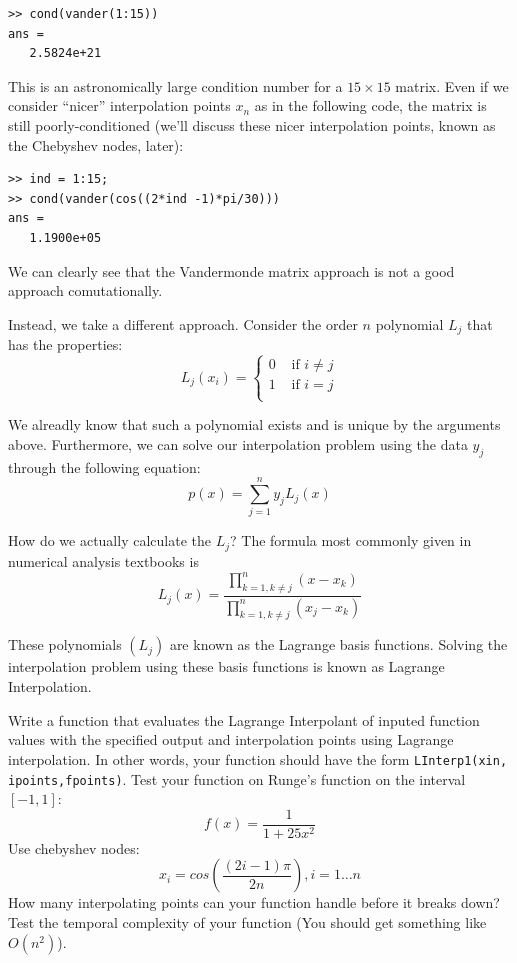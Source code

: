 \begin{verbatim}
>> cond(vander(1:15))
ans =
   2.5824e+21
\end{verbatim}

This is an astronomically large condition number for a $15 \times 15$ matrix. Even if we consider ``nicer'' interpolation points $x_n$ as in the following code, the matrix is still poorly-conditioned (we'll discuss these nicer interpolation points, known as the Chebyshev nodes, later):

\begin{verbatim}
>> ind = 1:15;
>> cond(vander(cos((2*ind -1)*pi/30)))
ans =
   1.1900e+05
\end{verbatim}

We can clearly see that the Vandermonde matrix approach is not a good approach comutationally.

Instead, we take a different approach. Consider the order $n$ polynomial $L_j$ that has the properties:
\[
L_j(x_i) = \begin{cases} 0 &\mbox{ if } i \neq j\\ 1 &\mbox{ if } i =j \\ \end{cases}
\]

We alreadly know that such a polynomial exists and is unique by the arguments above. Furthermore, we can solve our interpolation problem using the data $y_j$ through the following equation:
\[
p(x) = \sum_{j=1}^n y_j L_j(x)
\]

How do we actually calculate the $L_j$? The formula most commonly given in numerical analysis textbooks is
\[
L_j(x) = \frac{\displaystyle\prod_{k=1, k \neq j}^n (x-x_k)}{\displaystyle\prod_{k=1, k \neq j}^n (x_j-x_k)}
\]

These polynomials $(L_j)$ are known as the Lagrange basis functions. Solving the interpolation problem using these basis functions is known as Lagrange Interpolation.

\begin{problem}
Write a function that evaluates the Lagrange Interpolant of inputed function values with the specified output and interpolation points using Lagrange interpolation. In other words, your function should have the form {\tt LInterp1(xin, ipoints,fpoints)}. Test your function on Runge's function on the interval $[-1,1]$:
\[
f(x) = \frac{1}{1+25x^2}
\]
Use chebyshev nodes:
\[
x_i = cos\left(\frac{(2i-1)\pi}{2n}\right), i = 1\ldots n
\]
How many interpolating points can your function handle before it breaks down? Test the temporal complexity of your function (You should get something like $O(n^2)$).
\end{problem}

